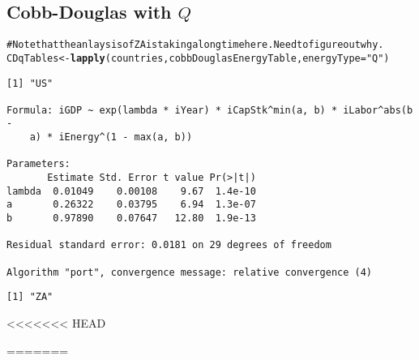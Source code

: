 \documentclass[preprint,authoryear,12pt]{elsarticle}\usepackage{graphicx, color}
\makeatletter
\newcommand{\hlfunctioncall}[1]{\textcolor[rgb]{0.501960784313725,0,0.329411764705882}{\textbf{#1}}}%
\newcommand{\hlstring}[1]{\textcolor[rgb]{0.6,0.6,1}{#1}}%
\newcommand{\hlcomment}[1]{\textcolor[rgb]{0.180392156862745,0.6,0.341176470588235}{#1}}%
\newenvironment{kframe}{%
 \def\at@end@of@kframe{}%
 \ifinner\ifhmode%
  \def\at@end@of@kframe{\end{minipage}}%
  \begin{minipage}{\columnwidth}%
 \fi\fi%
 \def\FrameCommand##1{\hskip\@totalleftmargin \hskip-\fboxsep
 \colorbox{shadecolor}{##1}\hskip-\fboxsep
     \hskip-\linewidth \hskip-\@totalleftmargin \hskip\columnwidth}%
 \MakeFramed {\advance\hsize-\width
   \@totalleftmargin\z@ \linewidth\hsize
   \@setminipage}}%
 {\par\unskip\endMakeFramed%
 \at@end@of@kframe}
\newenvironment{knitrout}{}{} %
\makeatother
\begin{document}
\subsection{Cobb-Douglas with $Q$}

\begin{knitrout}
\color{fgcolor}\begin{kframe}
\begin{alltt}
\hlcomment{# Note that the anlaysis of ZA is taking a long time here. Need to figure out why.}
CDqTables <- \hlfunctioncall{lapply}(countries, cobbDouglasEnergyTable, energyType=\hlstring{"Q"})
\end{alltt}
\begin{verbatim}
[1] "US"

Formula: iGDP ~ exp(lambda * iYear) * iCapStk^min(a, b) * iLabor^abs(b - 
    a) * iEnergy^(1 - max(a, b))

Parameters:
       Estimate Std. Error t value Pr(>|t|)
lambda  0.01049    0.00108    9.67  1.4e-10
a       0.26322    0.03795    6.94  1.3e-07
b       0.97890    0.07647   12.80  1.9e-13

Residual standard error: 0.0181 on 29 degrees of freedom

Algorithm "port", convergence message: relative convergence (4) 
\end{verbatim}


{\ttfamily\noindent\itshape\color{messagecolor}{Waiting for profiling to be done...}}\begin{verbatim}
[1] "ZA"
\end{verbatim}

<<<<<<< HEAD
{\ttfamily\noindent\bfseries\color{errorcolor}{Error: could not find function "deltaMethod"}}\end{kframe}
\end{knitrout}
=======

{\ttfamily\noindent\color{warningcolor}{Warning: longer object length is not a multiple of shorter object length}}

{\ttfamily\noindent\color{warningcolor}{Warning: longer object length is not a multiple of shorter object length}}

{\ttfamily\noindent\color{warningcolor}{Warning: longer object length is not a multiple of shorter object length}}

{\ttfamily\noindent\color{warningcolor}{Warning: longer object length is not a multiple of shorter object length}}

{\ttfamily\noindent\color{warningcolor}{Warning: longer object length is not a multiple of shorter object length}}
\end{document}

